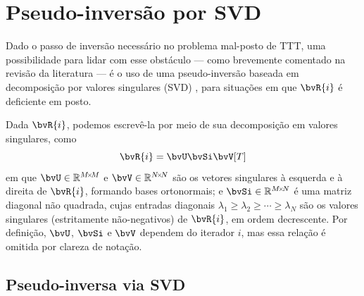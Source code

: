\section{Pseudo-inversão por SVD}

Dado o passo de inversão necessário no problema mal-posto de TTT, uma possibilidade para lidar com esse obstáculo --- como brevemente comentado na revisão da literatura --- é o uso de uma pseudo-inversão baseada em decomposição por valores singulares (SVD) \cite{berrar_practical_2003}, para situações em que $\bvR{i}$ é deficiente em posto.

Dada $\bvR{i}$, podemos escrevê-la por meio de sua decomposição em valores singulares, como
\begin{equation}
	\bvR{i} = \bvU \bvSi \bvV[T]
\end{equation}
em que $\bvU \in \re^{\sz{M}{M}}$ e $\bvV \in \re^{\sz{N}{N}}$ são os vetores singulares à esquerda e à direita de $\bvR{i}$, formando bases ortonormais; e $\bvSi \in \re^{\sz{M}{N}}$ é uma matriz diagonal não quadrada, cujas entradas diagonais $\lambda_1 \geq \lambda_2 \geq \cdots \geq \lambda_N$ são os valores singulares (estritamente não-negativos) de $\bvR{i}$, em ordem decrescente. Por definição, $\bvU$, $\bvSi$ e $\bvV$ dependem do iterador $i$, mas essa relação é omitida por clareza de notação.

\subsection{Pseudo-inversa via SVD}

